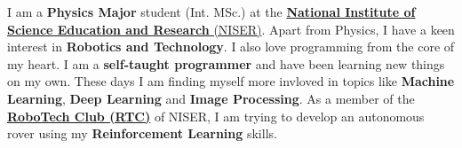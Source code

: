 	\hspace{5mm} I am a \textbf{Physics Major} student (Int. MSc.) at the \href{https://www.niser.ac.in/}{\textbf{National Institute of Science Education and Research} (NISER)}.
	Apart from Physics, I have a keen interest in \textbf{Robotics and Technology}.
	I also love programming from the core of my heart.
	I am a \textbf{self-taught programmer} and have been learning new things on my own.
	These days I am finding myself more invloved in topics like \textbf{Machine Learning}, \textbf{Deep Learning} and \textbf{Image Processing}.
	As a member of the \href{https://www.niser.ac.in/~smishra/club/rtc/}{\textbf{RoboTech Club (RTC)}} of NISER, I am trying to develop an autonomous rover using my \textbf{Reinforcement Learning} skills.

